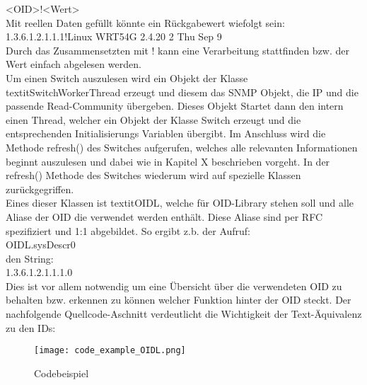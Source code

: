 <OID>!<Wert>\\

Mit reellen Daten gefüllt könnte ein Rückgabewert wiefolgt sein:\\

1.3.6.1.2.1.1.1!Linux WRT54G 2.4.20 2 Thu Sep 9\\


Durch das Zusammensetzten mit ! kann eine Verarbeitung stattfinden bzw. der Wert einfach abgelesen werden.\\
Um einen Switch auszulesen wird ein Objekt der Klasse textit{SwitchWorkerThread} erzeugt und diesem das SNMP Objekt, die IP und die passende Read-Community übergeben. Dieses Objekt Startet dann den intern einen Thread, welcher ein Objekt der Klasse Switch erzeugt und die entsprechenden Initialisierungs Variablen übergibt. Im Anschluss wird die Methode refresh() des Switches aufgerufen, welches alle relevanten Informationen beginnt auszulesen und dabei wie in Kapitel X beschrieben vorgeht. In der refresh() Methode des Switches wiederum wird auf spezielle Klassen zurückgegriffen.\\
Eines dieser Klassen ist textit{OIDL}, welche für OID-Library stehen soll und alle Aliase der OID die verwendet werden enthält. Diese Aliase sind per RFC spezifiziert und 1:1 abgebildet. So ergibt z.b. der Aufruf: \\

OIDL.sysDescr0\\

den String:\\

1.3.6.1.2.1.1.1.0\\

Dies ist vor allem notwendig um eine Übersicht über die verwendeten OID zu behalten bzw. erkennen zu können welcher Funktion hinter der OID steckt. Der nachfolgende Quellcode-Aschnitt verdeutlicht die Wichtigkeit der Text-Äquivalenz zu den IDs:\\

\begin{figure}[H]
\centering
\texttt{[image: code\_example\_OIDL.png]}
\caption{Codebeispiel}
\label{fig:classdiagramcode}
\end{figure}

